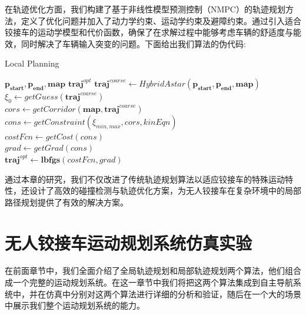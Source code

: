 \documentclass[master,academic]{ysuthesis} %
\begin{document}
	在轨迹优化方面，我们构建了基于非线性模型预测控制（NMPC）的轨迹规划方法，定义了优化问题并加入了动力学约束、运动学约束及避障约束。通过引入适合铰接车的运动学模型和代价函数，确保了在求解过程中能够考虑车辆的舒适度与能效，同时解决了车辆输入突变的问题。下面给出我们算法的伪代码:
	\begin{algorithm}[H]  
		\caption{Local Planning}  
		\label{alg:local_planning}  
		\begin{algorithmic}[1]  
			\REQUIRE  
			$\mathbf{p_{start}},\mathbf{p_{end}},\mathbf{map}$
			\ENSURE  
			$\mathbf{traj}^{opt}$
			\STATE $\mathbf{traj}^{coarse} \leftarrow HybridAstar(\mathbf{p_{start}},\mathbf{p_{end}},\mathbf{map})$\\
			\STATE $\xi_0 \leftarrow getGuess(\mathbf{traj}^{coarse})$\\
			\STATE $cors \leftarrow getCorridor(\mathbf{map},\mathbf{traj}^{coarse})$\\
			\STATE $cons \leftarrow getConstraint(\xi_{min,max},cors,kinEqn)$\\
			\STATE $costFcn \leftarrow getCost(cons)$\\
			\STATE $grad \leftarrow getGrad(cons)$ \\
		   \RETURN $\mathbf{traj}^{opt} \leftarrow \mathbf{lbfgs}(costFcn,grad)$
		\end{algorithmic}  
	\end{algorithm}

	通过本章的研究，我们不仅改进了传统轨迹规划算法以适应铰接车的特殊运动特性，还设计了高效的碰撞检测与轨迹优化方案，为无人铰接车在复杂环境中的局部路径规划提供了有效的解决方案。
	
	\chapter{无人铰接车运动规划系统仿真实验}
	在前面章节中，我们全面介绍了全局轨迹规划和局部轨迹规划两个算法，他们组合成一个完整的运动规划系统。在这一章节中我们将把这两个算法集成到自主导航系统中，并在仿真中分别对这两个算法进行详细的分析和验证，随后在一个大的场景中展示我们整个运动规划系统的能力。
	
\end{document}

